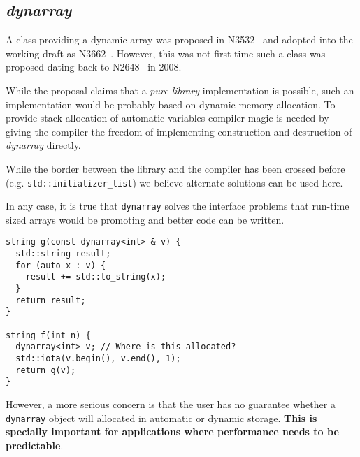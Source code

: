 \subsection{\emph{dynarray}}

A class providing a dynamic array was proposed in N3532~\cite{n3532} and adopted
into the working draft as N3662~\cite{n3662}. However, this was not first time
such a class was proposed dating back to N2648~\cite{n2648} in 2008.

While the proposal claims that a \emph{pure-library} implementation is possible,
such an implementation would be probably based on dynamic memory allocation. To
provide stack allocation of automatic variables compiler magic is needed by
giving the compiler the freedom of implementing construction and destruction of
\emph{dynarray} directly.

While the border between the library and the compiler has been crossed before
(e.g. \verb+std::initializer_list+) we believe alternate solutions can be used
here. 

In any case, it is true that \verb+dynarray+ solves the interface problems that
run-time sized arrays would be promoting and better code can be written.

\begin{lstlisting}
string g(const dynarray<int> & v) {
  std::string result;
  for (auto x : v) {
    result += std::to_string(x);
  }
  return result;
}

string f(int n) {
  dynarray<int> v; // Where is this allocated?
  std::iota(v.begin(), v.end(), 1);
  return g(v);
} 
\end{lstlisting}

However, a more serious concern is that the user has no guarantee whether
a \verb+dynarray+ object will allocated in automatic or dynamic storage.
\textbf{This is specially important for applications where performance 
needs to be predictable}.
